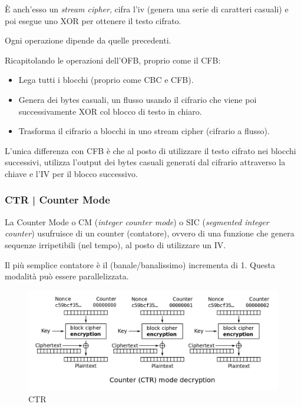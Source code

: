 \textsf{\small È anch'esso un \emph{stream cipher}, cifra l'iv (genera una serie di caratteri casuali)  e poi esegue uno XOR per ottenere il testo cifrato.}

\textsf{\small Ogni operazione dipende da quelle precedenti.}

\textsf{\small Ricapitolando le operazioni dell'OFB, proprio come il CFB:}

\begin{itemize}
	\item \textsf{\small Lega tutti i blocchi (proprio come CBC e CFB).}
	\item \textsf{\small Genera dei bytes casuali, un flusso usando il cifrario che viene poi successivamente XOR col blocco di testo in chiaro.}
	\item \textsf{\small Trasforma il cifrario a blocchi in uno stream cipher (cifrario a flusso).}
\end{itemize}

\textsf{\small L'unica differenza con CFB è che al posto di utilizzare il testo cifrato nei blocchi successivi, utilizza l'output dei bytes casuali generati dal cifrario attraverso la chiave e l'IV per il blocco successivo.}

\subsubsection{CTR | Counter Mode}

\textsf{\small La Counter Mode o CM (\emph{integer counter mode}) o SIC (\emph{segmented integer counter}) usufruisce di un counter (contatore), ovvero di una funzione che genera sequenze irripetibili (nel tempo), al posto di utilizzare un IV.}

\textsf{\small Il più semplice contatore è il (banale/banalissimo) incrementa di 1.}
\textsf{\small Questa modalità può essere parallelizzata.}

\begin{figure}[H]
	\centering
	\includegraphics[width=1\textwidth, height=1\textheight, keepaspectratio]{./images/aes_modes/ctr.png}
	\caption{CTR}
	\label{fig:ctr}
\end{figure}

